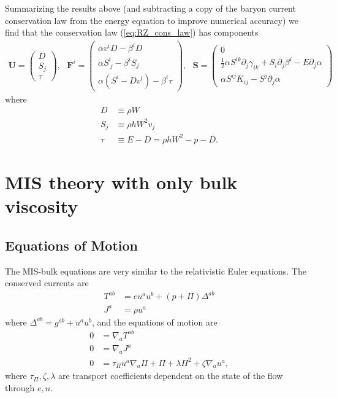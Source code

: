 \documentclass[12pt]{article}
\numberwithin{equation}{section}
\begin{document}
Summarizing the results above (and subtracting a copy of the baryon current conservation law from the energy equation to improve numerical accuracy) we find that the conservation law (\ref{eq:RZ_cons_law}) has components
\begin{equation}
\begin{aligned}
\bm{U} =
\begin{pmatrix}
D \\
S_j \\
\tau
\end{pmatrix},~~~
\bm{F}^i =
\begin{pmatrix}
\alpha v^i D - \beta^i D \\
\alpha S^{i}_{~j} - \beta^i S_j \\
\alpha (S^i - D v^i) - \beta^i \tau
\end{pmatrix},~~~
\bm{S} =
\begin{pmatrix}
0 \\
\frac{1}{2} \alpha S^{ik} \partial_j \gamma_{ik} + S_i \partial_j \beta^i - E \partial_j \alpha \\
\alpha S^{ij} K_{ij} - S^j \partial_j \alpha
\end{pmatrix}
\end{aligned}
\end{equation}
where
\begin{align}
D &\equiv \rho W \\
S_j &\equiv \rho h W^2 v_j \\
\tau &\equiv E - D = \rho h W^2 - p - D.
\end{align}

\clearpage

\section{MIS theory with only bulk viscosity}

\subsection{Equations of Motion}

The MIS-bulk equations \cite{Bemfica19} are very similar to the relativistic Euler equations.
The conserved currents are
\begin{align}
T^{ab} &= e u^a u^b + (p + \Pi) \Delta^{ab} \\
J^{a} &= \rho u^a
\end{align}
where $\Delta^{ab} = g^{ab} + u^a u^b$, and the equations of motion are
\begin{align}
0 &= \nabla_{a} T^{ab} \\
0 &= \nabla_{a} J^{a} \\
0 &= \tau_{\Pi} u^a \nabla_a \Pi + \Pi + \lambda \Pi^2 + \zeta \nabla_a u^a, \label{eq:bulk_eq}
\end{align}
where $\tau_{\Pi}, \zeta, \lambda$ are transport coefficients dependent on the state of the flow through $e, n$.
\end{document}
